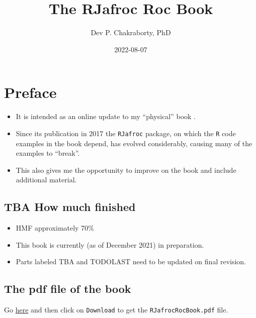 \documentclass[
]{book}
\title{The RJafroc Roc Book}
\author{Dev P. Chakraborty, PhD}
\date{2022-08-07}
\providecommand{\tightlist}{%
  \setlength{\itemsep}{0pt}\setlength{\parskip}{0pt}}
\begin{document}
\maketitle

{
\setcounter{tocdepth}{1}
\tableofcontents
}
\hypertarget{preface}{%
\chapter*{Preface}\label{preface}}

\begin{itemize}
\tightlist
\item
  It is intended as an online update to my ``physical'' book \citep{chakraborty2017observer}.
\item
  Since its publication in 2017 the \texttt{RJafroc} package, on which the \texttt{R} code examples in the book depend, has evolved considerably, causing many of the examples to ``break''.
\item
  This also gives me the opportunity to improve on the book and include additional material.
\end{itemize}

\hypertarget{tba-how-much-finished}{%
\section*{TBA How much finished}\label{tba-how-much-finished}}

\begin{itemize}
\tightlist
\item
  HMF approximately 70\%
\item
  This book is currently (as of December 2021) in preparation.
\item
  Parts labeled TBA and TODOLAST need to be updated on final revision.
\end{itemize}

\hypertarget{the-pdf-file-of-the-book}{%
\section*{The pdf file of the book}\label{the-pdf-file-of-the-book}}

Go \href{https://github.com/dpc10ster/RJafrocRocBook/blob/gh-pages/RJafrocRocBook.pdf}{here} and then click on \texttt{Download} to get the \texttt{RJafrocRocBook.pdf} file.
\end{document}
